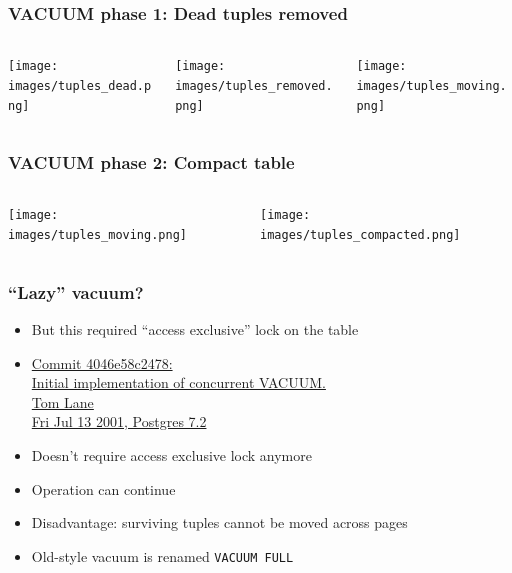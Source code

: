 \begin{frame}
  \frametitle{VACUUM phase 1: Dead tuples removed}
  \begin{columns}
    \begin{column}{0.33\textwidth}
      \texttt{[image: images/tuples\_dead.png]}
    \end{column}
    \begin{column}{0.33\textwidth}
      \texttt{[image: images/tuples\_removed.png]}
    \end{column}

    \begin{column}{0.33\textwidth}
      \texttt{[image: images/tuples\_moving.png]}
    \end{column}

  \end{columns}
\end{frame}

\begin{frame}
  \frametitle{VACUUM phase 2: Compact table}
  \begin{columns}
    \begin{column}{0.33\textwidth}
      \texttt{[image: images/tuples\_moving.png]}
    \end{column}
    \begin{column}{0.33\textwidth}
      \texttt{[image: images/tuples\_compacted.png]}
    \end{column}
  \end{columns}
\end{frame}

\begin{frame}
  \frametitle{``Lazy'' vacuum?}
  \begin{itemize}
    \item But this required ``access exclusive'' lock on the table
    \item {\linksize \href{https://git.postgresql.org/cgit/postgresql.git/commit/?id=4046e58c2478cfcdd4334e2c282b5a42f047ea0b}
      {Commit 4046e58c2478: \faExternalLink \\
      Initial implementation of concurrent VACUUM. \\
      Tom Lane \\
      Fri Jul 13 2001, Postgres 7.2}}
    \item Doesn't require access exclusive lock anymore
    \item Operation can continue
    \item Disadvantage: surviving tuples cannot be moved across pages
    \item Old-style vacuum is renamed \texttt{VACUUM FULL}
  \end{itemize}
\end{frame}



